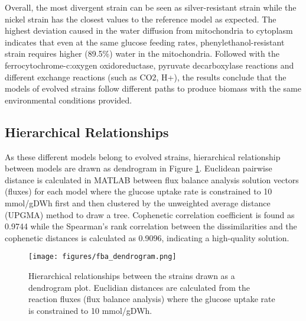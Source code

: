 \vspace{-1.0cm}

Overall, the most divergent strain can be seen as silver-resistant strain while the nickel strain has the closest values to the reference model as expected. The highest deviation caused in the water diffusion from mitochondria to cytoplasm indicates that even at the same glucose feeding rates, phenylethanol-resistant strain requires higher (89.5\%) water in the mitochondria. Followed with the ferrocytochrome-c:oxygen oxidoreductase, pyruvate decarboxylase reactions and different exchange reactions (such as CO2, H+), the results conclude that the models of evolved strains follow different paths to produce biomass with the same environmental conditions provided.


 \subsection{Hierarchical Relationships}

As these different models belong to evolved strains, hierarchical relationship between models are drawn as dendrogram in Figure \ref{fig:fba_dendrogram}. Euclidean pairwise distance is calculated in MATLAB between flux balance analysis solution vectors (fluxes) for each model where the glucose uptake rate is constrained to 10 mmol/gDWh first and then clustered by the unweighted average distance (UPGMA) method to draw a tree. Cophenetic correlation coefficient is found as 0.9744 while the Spearman's rank correlation between the dissimilarities and the cophenetic distances is calculated as 0.9096, indicating a high-quality solution.

\begin{figure}[H]
  \begin{center}
  \texttt{[image: figures/fba\_dendrogram.png]}
  \caption[Hierarchical relationships between the strains drawn as a dendrogram plot. Euclidian distances are calculated from the reaction fluxes (flux balance analysis) where the glucose uptake rate is constrained to 10 mmol/gDWh]{Hierarchical relationships between the strains drawn as a dendrogram plot. Euclidian distances are calculated from the reaction fluxes (flux balance analysis) where the glucose uptake rate is constrained to 10 mmol/gDWh.}
  \label{fig:fba_dendrogram}
  \end{center}
\end{figure}

\vspace{-1.0cm}

